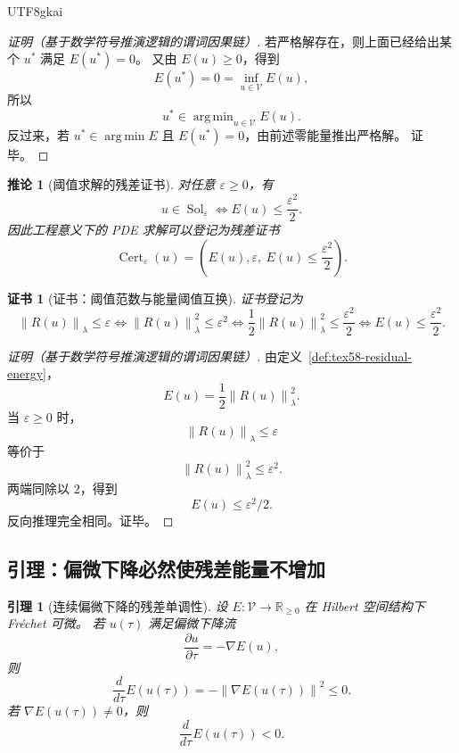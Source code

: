 \documentclass[12pt]{article}
\newtheorem{corollary}{推论}[section]
\newtheorem{lemma}{引理}[section]
\newtheorem{Certificate}{证书}[section]
\newcommand{\RR}{\mathbb{R}}
\newcommand{\Vcal}{\mathcal V}
\newcommand{\norm}[1]{\left\lVert #1 \right\rVert}
\DeclareMathOperator{\Sol}{Sol}
\DeclareMathOperator{\Cert}{Cert}
\DeclareMathOperator*{\argmin}{arg\,min}
\begin{document}
\begin{CJK*}{UTF8}{gkai}
\begin{proof}[证明（基于数学符号推演逻辑的谓词因果链）]
若严格解存在，则上面已经给出某个 \(u^\ast\) 满足 \(E(u^\ast)=0\)。
又由 \(E(u)\ge0\)，得到
\[
  E(u^\ast)=0=\inf_{u\in\Vcal}E(u),
\]
所以
\[
  u^\ast\in\argmin_{u\in\Vcal}E(u).
\]
反过来，若 \(u^\ast\in\argmin E\) 且 \(E(u^\ast)=0\)，由前述零能量推出严格解。
证毕。
\end{proof}

\begin{corollary}[阈值求解的残差证书]
\label{cor:tex58-threshold-solution}
对任意 \(\varepsilon\ge0\)，有
\[
  u\in\Sol_{\varepsilon}
  \Longleftrightarrow
  E(u)\le \frac{\varepsilon^2}{2}.
\]
因此工程意义下的 PDE 求解可以登记为残差证书
\[
  \Cert_{\varepsilon}(u)
  =
  \left(E(u),\varepsilon,\ E(u)\le\frac{\varepsilon^2}{2}\right).
\]
\end{corollary}

\begin{Certificate}[证书：阈值范数与能量阈值互换]
\label{cert:tex58-threshold-solution}
证书登记为
\[
  \norm{R(u)}_{\lambda}\le\varepsilon
  \Longleftrightarrow
  \norm{R(u)}_{\lambda}^{2}\le\varepsilon^2
  \Longleftrightarrow
  \frac12\norm{R(u)}_{\lambda}^{2}\le\frac{\varepsilon^2}{2}
  \Longleftrightarrow
  E(u)\le\frac{\varepsilon^2}{2}.
\]
\end{Certificate}

\begin{proof}[证明（基于数学符号推演逻辑的谓词因果链）]
由定义~\ref{def:tex58-residual-energy}，
\[
  E(u)=\frac12\norm{R(u)}_{\lambda}^{2}.
\]
当 \(\varepsilon\ge0\) 时，
\[
  \norm{R(u)}_{\lambda}\le\varepsilon
\]
等价于
\[
  \norm{R(u)}_{\lambda}^{2}\le\varepsilon^2.
\]
两端同除以 \(2\)，得到
\[
  E(u)\le\varepsilon^2/2.
\]
反向推理完全相同。证毕。
\end{proof}

\subsection{引理：偏微下降必然使残差能量不增加}
\label{subsec:tex58-gradient-descent-lemma}

\begin{lemma}[连续偏微下降的残差单调性]
\label{lem:tex58-continuous-descent}
设 \(E:\Vcal\to\RR_{\ge0}\) 在 Hilbert 空间结构下 Fréchet 可微。
若 \(u(\tau)\) 满足偏微下降流
\[
  \frac{\partial u}{\partial\tau}
  =
  -\nabla E(u),
\]
则
\[
  \frac{d}{d\tau}E(u(\tau))
  =
  -\norm{\nabla E(u(\tau))}^{2}
  \le0.
\]
若 \(\nabla E(u(\tau))\neq0\)，则
\[
  \frac{d}{d\tau}E(u(\tau))<0.
\]
\end{lemma}


\end{CJK*}
\end{document}
